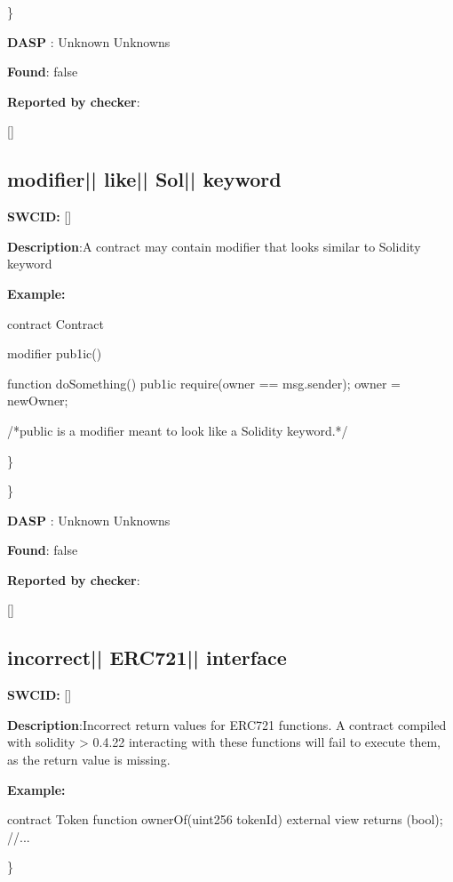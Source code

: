 \documentclass{article}
\begin{document}
\} 

\textbf{DASP} : Unknown Unknowns

\textbf{Found}: false

\textbf{Reported by checker}: 
\begin{ffcode} 

[]
\end{ffcode} 
\subsection{modifier{|\textunderscore| }like{|\textunderscore| }Sol{|\textunderscore| }keyword} 
\textbf{SWC{\textunderscore }ID:} []

\textbf{Description}:A contract may contain modifier that looks similar to Solidity keyword


\textbf{Example:} 
\begin{ffcode} 

contract Contract{
    modifier pub1ic() {
    }

    function doSomething() pub1ic {
        require(owner == msg.sender);
        owner = newOwner;
    }
}

 /*public is a modifier meant to look like a Solidity keyword.*/ 

\end{ffcode} 
\} 

\} 

\textbf{DASP} : Unknown Unknowns

\textbf{Found}: false

\textbf{Reported by checker}: 
\begin{ffcode} 

[]
\end{ffcode} 
\subsection{incorrect{|\textunderscore| }ERC721{|\textunderscore| }interface} 
\textbf{SWC{\textunderscore }ID:} []

\textbf{Description}:Incorrect return values for ERC721 functions. A contract compiled with solidity > 0.4.22 interacting with these functions will fail to execute them, as the return value is missing.


\textbf{Example:} 
\begin{ffcode} 

contract Token{
    function ownerOf(uint256 \textunderscore tokenId) external view returns (bool);
    //...
}

\end{ffcode} 
\} 
\end{document}
